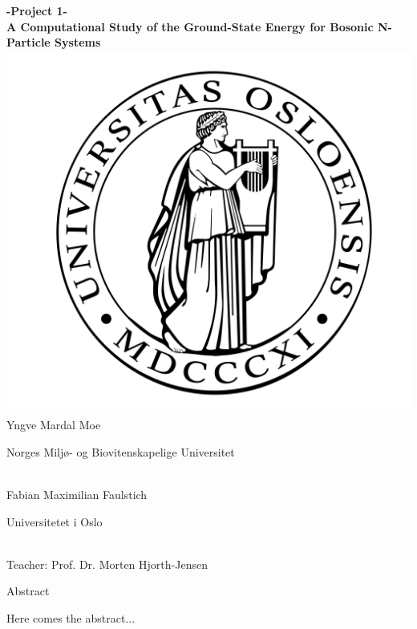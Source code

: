 \documentclass[11pt,a4paper]{article}
\numberwithin{equation}{section}
\begin{document}
	
\thispagestyle{empty}
	
\begin{center}
\begin{minipage}{\textwidth}
			\vspace{0.5cm}
			\centering
			\Huge{\textbf{-Project 1-\\A Computational Study of the Ground-State Energy for Bosonic N-Particle Systems }} \\ 
			\vspace{2cm}
			\includegraphics[width=.4\textwidth]{uio}\\
			\vspace{2cm}
			\Huge
			\vspace{0cm}
			Yngve  Mardal Moe\\
			\begin{large}Norges Miljø- og Biovitenskapelige Universitet\end{large}\\
			Fabian Maximilian Faulstich\\
			\begin{large}Universitetet i Oslo\end{large}\\
			\vspace{1.5cm}
			\Huge
			Teacher: Prof. Dr. Morten Hjorth-Jensen\\
			
\end{minipage}
\end{center}
		
\cleardoublepage
\thispagestyle{empty}
\quad
\newpage
\thispagestyle{empty}

\begin{minipage}{0.9\textwidth}
\vspace{5cm}
\begin{center}
\Huge{Abstract}
\end{center}
Here comes the abstract...
\end{minipage}
\cleardoublepage
\thispagestyle{empty}
\quad
\newpage
\thispagestyle{empty}
\end{document}
